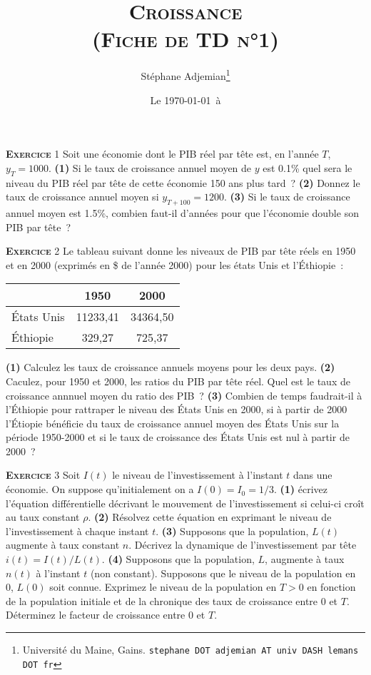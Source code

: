\documentclass[10pt,a4paper,notitlepage]{article}
\newcommand{\exercice}[1]{\textsc{\textbf{Exercice}} #1}
\newcommand{\question}[1]{\textbf{(#1)}}
\begin{document}
\title{\textsc{Croissance\\ \small{(Fiche de TD n°1)}}}
\author{Stéphane Adjemian\thanks{Université du Maine, Gains. \texttt{stephane DOT adjemian AT univ DASH lemans DOT fr}}}
\date{Le \today\ à \thistime}

\maketitle

\exercice{1}  Soit une  économie dont  le PIB  réel par  tête est,  en
l'année $T$, $y_T=1000$.  \question{1} Si le taux de croissance annuel
moyen de  $y$ est 0.1\% quel  sera le niveau  du PIB réel par  tête de
cette économie  150 ans  plus tard ?  \question{2}  Donnez le  taux de
croissance annuel  moyen si $y_{T+100}=1200$. \question{3}  Si le taux
de croissance  annuel moyen est  1.5\%, combien faut-il  d'années pour
que l'économie double son PIB par tête ?\newline


\exercice{2}  Le tableau  suivant donne  les niveaux  de PIB  par tête
réels en  1950 et en  2000 (exprimés en \$  de l'année 2000)  pour les
états Unis et l'Éthiopie~:
\begin{center}
\begin{tabular}{l|cc}\hline
 & 1950 & 2000 \\ \hline 
États Unis & 11233,41 & 34364,50 \\ 
Éthiopie & 329,27 & 725,37\\\hline\hline
\end{tabular}
\end{center}
\question{1} Calculez les  taux de croissance annuels  moyens pour les
deux pays. \question{2} Caculez, pour 1950  et 2000, les ratios du PIB
par tête réel.  Quel est le taux de croissance  annnuel moyen du ratio
des PIB ? \question{3} Combien de  temps faudrait-il à l'Éthiopie pour
rattraper  le niveau  des États  Unis  en 2000,  si à  partir de  2000
l'Étiopie bénéficie du taux de  croissance annuel moyen des États Unis
sur la  période 1950-2000 et si  le taux de croissance  des États Unis
est nul à partir de 2000 ?\newline


\exercice{3} Soit $I(t)$ le niveau de l'investissement à l'instant $t$
dans  une  économie.   On  suppose  qu'initialement  on  a  $I(0)=I_0=
1/3$.  \question{1}  écrivez  l'équation différentielle  décrivant  le
mouvement  de  l'investissement si  celui-ci  croît  au taux  constant
$\rho$.  \question{2}  Résolvez cette équation en  exprimant le niveau
de l'investissement  à chaque instant $t$.  \question{3} Supposons que
la  population, $L(t)$  augmente  à taux  constant  $n$.  Décrivez  la
dynamique de l'investissement par tête $i(t)=I(t)/L(t)$.  \question{4}
Supposons que la  population, $L$, augmente à taux  $n(t)$ à l'instant
$t$ (non  constant). Supposons que  le niveau  de la population  en 0,
$L(0)$ soit  connue. Exprimez le niveau  de la population en  $T>0$ en
fonction de  la population  initiale et  de la  chronique des  taux de
croissance entre 0 et $T$. Déterminez le facteur de croissance entre 0
et $T$.\newline
\end{document}
